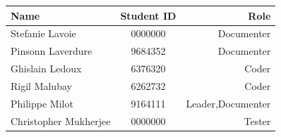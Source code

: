 \documentclass{article}
\begin{document}
\medskip
\begin{center}
\begin{tabular}{| l | c | r |}
\hline
Name & Student ID & Role \\
\hline
\hline
Stefanie Lavoie & 0000000 & Documenter\\
\hline
Pinsonn Laverdure & 9684352 & Documenter\\
\hline
Ghislain Ledoux & 6376320 & Coder\\
\hline
Rigil Malubay & 6262732 & Coder\\
\hline
Philippe Milot & 9164111 & Leader,Documenter \\
\hline
Christopher Mukherjee & 0000000 & Tester\\
\hline
\end{tabular}
\end{center}
\end{document}
